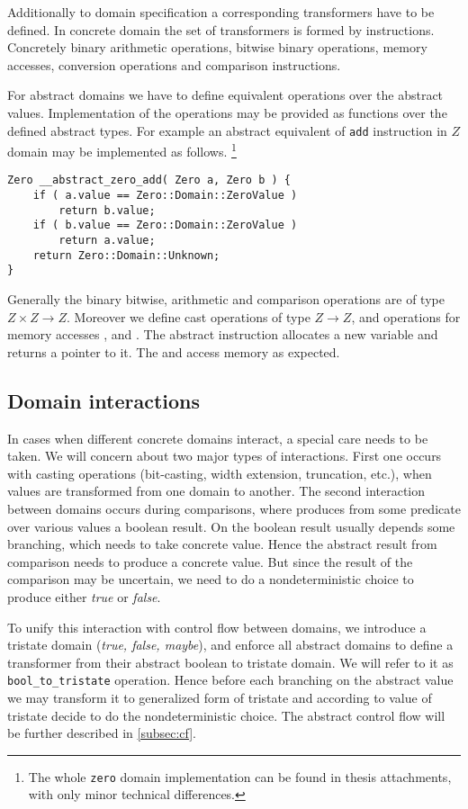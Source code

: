 Additionally to domain specification a corresponding transformers have to be
defined. In concrete domain the set of transformers is formed by \LLVM
instructions. Concretely binary arithmetic operations, bitwise binary
operations, memory accesses, conversion operations and comparison instructions.

For abstract domains we have to define equivalent operations over the abstract
values. Implementation of the operations may be provided as \Cpp{} functions over
the defined abstract types. For example an abstract equivalent of \texttt{add}
instruction in $Z$ domain may be implemented as follows. \footnote{The whole
\texttt{zero} domain implementation can be found in thesis attachments, with
only minor technical differences.}
\begin{verbatim}
Zero __abstract_zero_add( Zero a, Zero b ) {
    if ( a.value == Zero::Domain::ZeroValue )
        return b.value;
    if ( b.value == Zero::Domain::ZeroValue )
        return a.value;
    return Zero::Domain::Unknown;
}
\end{verbatim}

Generally the binary bitwise, arithmetic and comparison operations are of
type $Z \times Z \to Z$. Moreover we define cast operations of type $Z \to Z$,
and operations for memory accesses ,  and . The abstract  instruction allocates a new 
variable and returns a pointer to it. The  and  access memory as expected.

\subsection{Domain interactions} \label{sec:interactions}
In cases when different concrete domains interact, a special care needs to be
taken. We will concern about two major types of interactions. First one occurs
with casting operations (bit-casting, width extension, truncation, etc.), when
values are transformed from one domain to another. The second
interaction between domains occurs during comparisons, where \LLVM produces from
some predicate over various values a boolean result. On the boolean result
usually depends some branching, which needs to take concrete value. Hence the
abstract result from comparison needs to produce a concrete value. But since the
result of the comparison may be uncertain, we need to do a nondeterministic
choice to produce either \emph{true} or \emph{false}.

To unify this interaction with control flow between domains, we introduce
a tristate domain (\emph{true, false, maybe}),
and enforce all abstract domains to define a transformer from their abstract
boolean to tristate domain. We will refer to it as \texttt{bool\_to\_tristate}
operation. Hence before each branching on the abstract value we may transform it
to generalized form of tristate and according to value of tristate decide to do
the nondeterministic choice. The abstract control flow will be further described
in \autoref{subsec:cf}.

